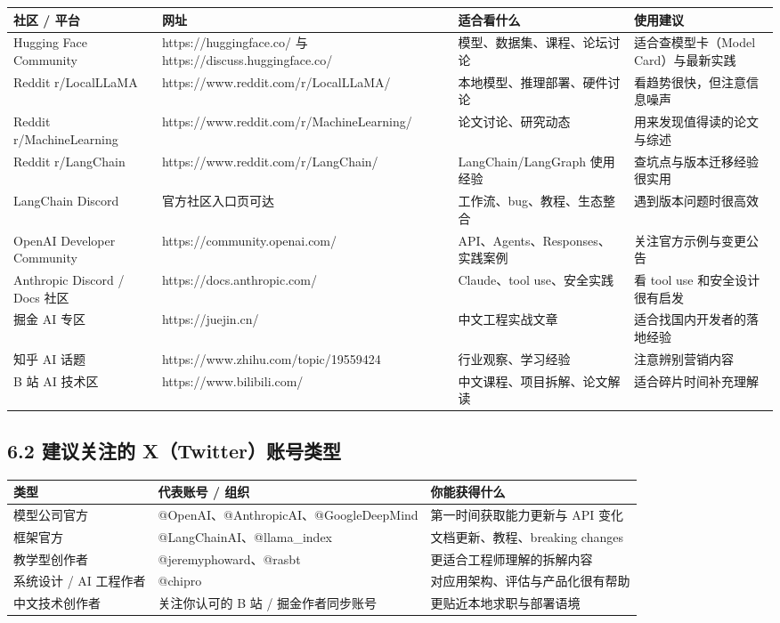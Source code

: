 \begingroup
\scriptsize
\setlength{\tabcolsep}{3pt}
\begin{longtable}{|p{}|p{}|p{}|p{}|}
\hline
社区 / 平台 & 网址 & 适合看什么 & 使用建议 \\ \hline
Hugging Face Community & https://huggingface.co/ 与 https://discuss.huggingface.co/ & 模型、数据集、课程、论坛讨论 & 适合查模型卡（Model Card）与最新实践 \\ \hline
Reddit r/LocalLLaMA & https://www.reddit.com/r/LocalLLaMA/ & 本地模型、推理部署、硬件讨论 & 看趋势很快，但注意信息噪声 \\ \hline
Reddit r/MachineLearning & https://www.reddit.com/r/MachineLearning/ & 论文讨论、研究动态 & 用来发现值得读的论文与综述 \\ \hline
Reddit r/LangChain & https://www.reddit.com/r/LangChain/ & LangChain/LangGraph 使用经验 & 查坑点与版本迁移经验很实用 \\ \hline
LangChain Discord & 官方社区入口页可达 & 工作流、bug、教程、生态整合 & 遇到版本问题时很高效 \\ \hline
OpenAI Developer Community & https://community.openai.com/ & API、Agents、Responses、实践案例 & 关注官方示例与变更公告 \\ \hline
Anthropic Discord / Docs 社区 & https://docs.anthropic.com/ & Claude、tool use、安全实践 & 看 tool use 和安全设计很有启发 \\ \hline
掘金 AI 专区 & https://juejin.cn/ & 中文工程实战文章 & 适合找国内开发者的落地经验 \\ \hline
知乎 AI 话题 & https://www.zhihu.com/topic/19559424 & 行业观察、学习经验 & 注意辨别营销内容 \\ \hline
B 站 AI 技术区 & https://www.bilibili.com/ & 中文课程、项目拆解、论文解读 & 适合碎片时间补充理解 \\ \hline
\end{longtable}
\endgroup

\subsection{6.2 建议关注的 X（Twitter）账号类型}

\begingroup
\scriptsize
\setlength{\tabcolsep}{3pt}
\begin{longtable}{|p{}|p{}|p{}|}
\hline
类型 & 代表账号 / 组织 & 你能获得什么 \\ \hline
模型公司官方 & @OpenAI、@AnthropicAI、@GoogleDeepMind & 第一时间获取能力更新与 API 变化 \\ \hline
框架官方 & @LangChainAI、@llama\_index & 文档更新、教程、breaking changes \\ \hline
教学型创作者 & @jeremyphoward、@rasbt & 更适合工程师理解的拆解内容 \\ \hline
系统设计 / AI 工程作者 & @chipro & 对应用架构、评估与产品化很有帮助 \\ \hline
中文技术创作者 & 关注你认可的 B 站 / 掘金作者同步账号 & 更贴近本地求职与部署语境 \\ \hline
\end{longtable}
\endgroup

